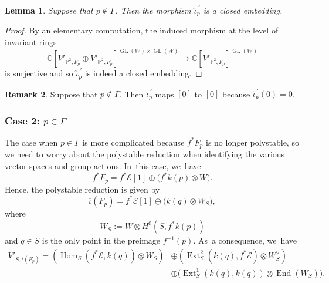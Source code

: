 \documentclass[JEP,XML,SOM,Unicode,published]{cedram}
\newcommand{\CC}{{\mathbb C}}\let\C\CC
\newcommand{\PP}{{\mathbb P}}\let\P\PP
\newcommand\cE{\mathcal{E}}
\DeclareMathOperator{\End}{End}
\DeclareMathOperator{\Ext}{Ext}
\DeclareMathOperator{\GL}{GL}
\DeclareMathOperator{\Hom}{Hom}
\newtheorem{lemm}{Lemma}[section]
\theoremstyle{definition}
\newtheorem{rema}[lemm]{Remark}
\begin{document}
\begin{lemm}\label{lem:PointIsNotInGamma}
Suppose that $p\notin \mathsf{\Gamma}$.
Then the morphism $\widehat{\iota}_p^{\ \prime}$ is a closed embedding.
\end{lemm}

\begin{proof}
By an elementary computation, the induced morphism at the level of invariant rings
\[
\CC[V'_{\PP^2,F_p}\oplus V'_{\PP^2,F_p}]^{\GL(W) \times \GL(W)} \to \CC[V'_{\PP^2,F_p}]^{\GL(W)}
\]
is surjective and so $\widehat{\iota}_p^{\ \prime}$ is indeed a closed embedding.
\end{proof}

\begin{rema}\label{rmk:0Case1}
Suppose that $p\notin \mathsf{\Gamma}$.
Then $\widehat{\iota}_p^{\ \prime}$ maps $[0]$ to $[0]$ because $\widetilde{\iota}_p^{\ \prime}(0)=0$.
\end{rema}

\subsubsection*{Case 2: $p\in\mathsf{\Gamma}$} The case when $p\in\mathsf{\Gamma}$ is more complicated because $f^*F_p$ is no longer polystable, so we need to worry about the polystable reduction when identifying the various vector spaces and group actions. In~this case, we~have
\[
f^*F_p = f^*\cE[1] \oplus \bigl(f^*k(p) \otimes W\bigr).
\]
Hence, the polystable reduction is given by
\[
\overline{\iota}(F_p) = f^*\cE[1] \oplus \bigl(k(q) \otimes W_S\bigr),
\]
where
\begin{equation*}\label{eq:WS}
W_S:=W\otimes H^0(S,f^*k(p))
\end{equation*}
and $q\in S$ is the only point in the preimage $f^{-1}(p)$. As~a consequence, we~have
\begin{equation}\label{eq:VSprime}
\begin{split}
V'_{S,\overline{\iota}(F_p)} = \left(\Hom_{S}(f^*\cE,k(q))\otimes W_S\right) &\oplus \left(\Ext^2_{S}(k(q),f^*\cE)\otimes W_S^\vee\right)\\
&\oplus \bigl(\Ext^1_{S}(k(q),k(q))\otimes \End(W_S)\bigr).
\end{split}
\end{equation}
\end{document}
